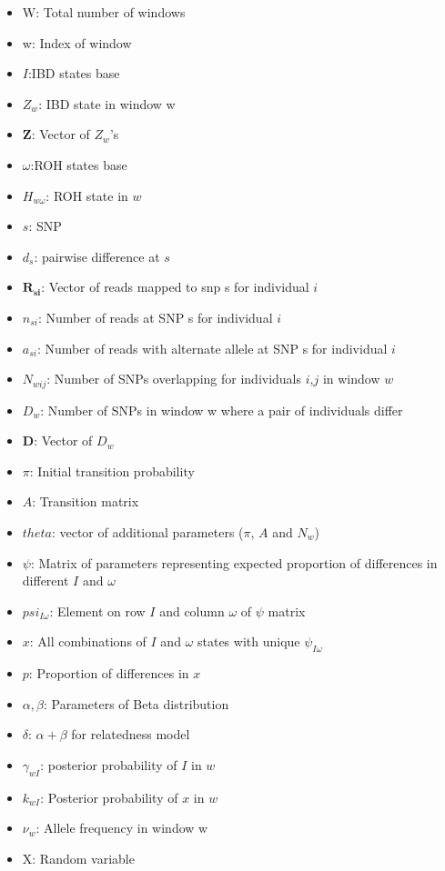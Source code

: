 \documentclass[12pt, letterpaper]{article}
\begin{document}
\begin{itemize}
\item W: Total number of windows
\item w: Index of window
\item $I$:IBD states base
\item $Z_w$: IBD state in window w
\item $\mathbf{Z}$: Vector of $Z_w$'s
\item $\omega$:ROH states base
\item $H_{w\omega}$: ROH state in $w$
\item $s$: SNP
\item $d_s$: pairwise difference at $s$
\item $\mathbf{R_{si}}$: Vector of reads mapped to snp s for individual $i$
\item $n_{si}$: Number of reads at SNP s for individual $i$
\item $a_{si}$: Number of reads with alternate allele at SNP s for individual $i$
\item $N_{wij}$: Number of SNPs overlapping for individuals $i$,$j$ in window $w$
\item $D_{w}$: Number of SNPs in window w where a pair of individuals differ
\item $\mathbf{D}$: Vector of $D_w$
\item $\pi$: Initial transition probability
\item $A$: Transition matrix
\item $theta$: vector of additional parameters ($\pi$, $A$ and $N_w$)
\item $\psi$: Matrix of parameters representing expected proportion of differences in different $I$ and $\omega$
\item $psi_{I\omega}$: Element on row $I$ and column $\omega$ of $\psi$ matrix
\item $x$: All combinations of $I$ and $\omega$ states with unique $\psi_{I\omega}$
\item $p$: Proportion of differences in $x$
\item $\alpha,\beta$: Parameters of Beta distribution
\item $\delta$: $\alpha + \beta$ for relatedness model
\item $\gamma_{wI}$: posterior probability of $I$ in $w$
\item $k_{wI}$: Posterior probability of $x$ in $w$ 
\item $\nu_{w}$: Allele frequency in window w
\item X: Random variable

\end{itemize}
\end{document}
